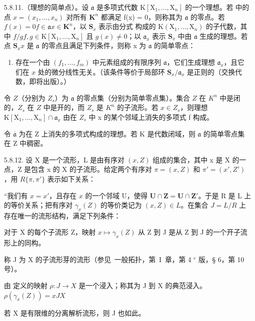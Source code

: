 5.8.11.（理想的简单点）。设 \(\mathfrak{a}\) 是多项式代数 \(\mathrm{K}[\mathrm{X}_1,\ldots ,\mathrm{X}_n]\) 的一个理想。若  中的点 \(x = (x_{1},\dots,x_{n})\) 对所有 \(\mathbf{K}^n\) 都满足 f(x) = 0，则称其为 \(\mathfrak{a}\) 的零点。若 \(f(x) = 0\)\(f\in \mathfrak{a}\)\(x\in \mathbf{K}^n\)，以 \(\mathbf{S}_x\) 表示由分式  构成的 \(\mathrm{K}(\mathrm{X}_1,\dots,\mathrm{X}_n)\) 的子代数，其中 \(f / g\)\(f,g\in \mathrm{K}[\mathrm{X}_1,\dots,\mathrm{X}_n]\) 且 \(g(x)\neq 0\)；以 \(\mathfrak{a}_x\) 表示 \(\mathbf{S}_x\) 中由 \(\mathfrak{a}\) 生成的理想。若点 \(\mathbf{S}_x\)\(x\) 是 \(\mathfrak{a}\) 的零点且满足下列条件，则称 x 为 \(\mathfrak{a}\) 的简单零点：

\begin{enumerate}
\def\labelenumi{(\Alph{enumi})}
\setcounter{enumi}{18}
\tightlist
\item
  存在一个由 \((f_1, \ldots, f_m)\) 中元素组成的有限序列 \(\mathfrak{a}\)，它们生成理想 \(\mathfrak{a}_x\)，且它们在 \(x\) 处的微分线性无关。（该条件等价于局部环 \(\mathbf{S}_x / \mathfrak{a}_x\) 是正则的（交换代数，即将出版）。）
\end{enumerate}

令 \(Z\)（分别为 \(Z_s\)）为 \(\mathfrak{a}\) 的零点集（分别为简单零点集）。集合 \(Z\) 在 \(K^n\) 中是闭的，\(Z_s\) 在 \(Z\) 中是开的，而 \(Z_s\) 是 \(K^{n}\) 的子流形。若 \(x \in Z_{s}\)，则理想 \(\mathrm{K}[\mathrm{X}_{1}, \ldots, \mathrm{X}_{n}] \cap \mathfrak{a}_{x}\) 由在 \(Z_{s}\) 中 x 的某个邻域上消失的多项式 f 构成。

令 \(\overline{\mathfrak{a}}\) 为在 Z 上消失的多项式构成的理想。若 K 是代数闭域，则 \(\mathfrak{a}\) 的简单零点集在 Z 中稠密。

5.8.12. 设 X 是一个流形，L 是由有序对 \((x, Z)\) 组成的集合，其中 x 是 X 的一点，Z 是包含 x 的 X 的子流形。给定两个有序对 \(\pi = (x, Z)\) 和 \(\pi' = (x', Z')\)，用 \(R\{\pi, \pi'\}\) 表示如下关系：

“我们有 \(x = x'\)，且存在 \(x\) 的一个邻域 U，使得 \(\mathbf{U} \cap \mathbf{Z} = \mathbf{U} \cap \mathbf{Z'}\)。于是 R 是 L 上的等价关系；把有序对 \(\gamma_x(Z)\) 的等价类记为 \((x, Z) \in L\)。在集合 \(J = L/R\) 上存在唯一的流形结构，满足下列条件：

对于 X 的每个子流形 Z，映射 \(x \mapsto \gamma_{x}(Z)\) 从 Z 到 J 是从 Z 到 J 的一个开子流形上的同构。

称 J 为 X 的子流形芽的流形（参见~一般拓扑，第~I~章，第 4 \(^{e}\) 版，§ 6，第 10 号）。

由  定义的映射 \(\rho: J \to X\) 是一个浸入；称其为 J 到 X 的典范浸入。\(\rho(\gamma_x(Z)) = x\)\(J\)\(X\)

若 X 是有限维的分离解析流形，则 J 也如此。

